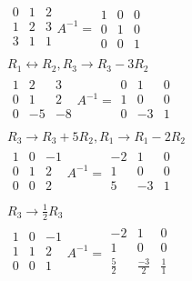 \documentclass{article}
\begin{document}
\begin{gather*}
\begin{matrix}
0 & 1 & 2\\
1 & 2 & 3\\
3 & 1 & 1\\
\end{matrix}A^{-1} = \begin{matrix}
1 & 0 & 0\\
0 & 1 & 0\\
0 & 0 & 1
\end{matrix}\\
R_1 \leftrightarrow R_2 , R_3 \rightarrow R_3 - 3R_2\\
\begin{matrix}
1 & 2 & 3\\ 
0 & 1 & 2\\
0 & -5 & -8\\
\end{matrix} A^{-1} = \begin{matrix}
0 & 1 & 0\\
1 & 0 & 0\\
0 & -3 & 1 \\
\end{matrix}\\
R_3 \rightarrow R_3 + 5R_2, R_1 \rightarrow R_1 - 2R_2\\
\begin{matrix}
1 & 0 & -1\\
0 & 1 & 2\\
0 & 0 & 2\\
\end{matrix} A^{-1} = \begin{matrix}
-2 & 1 & 0\\
1 & 0 & 0 \\
5 & -3 & 1\\
\end{matrix}\\
R_3 \rightarrow \frac{1}{2} R_3\\
\begin{matrix}
1 & 0 & -1\\
1 & 1 & 2\\
0 & 0 & 1\\
\end{matrix} A^{-1} = \begin{matrix}
-2 & 1 & 0 \\
1 & 0 & 0 \\
\frac{5}{2} & \frac{-3}{2} & \frac{1}{1}\\
\end{matrix}\\
\end{gather*}
\end{document}

